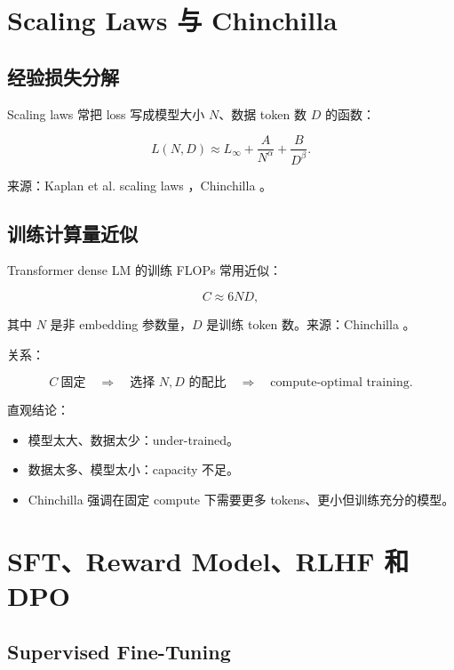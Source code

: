 \documentclass[UTF8,12pt]{ctexart}
\newcommand{\1}{\mathbf{1}}
\begin{document}
\section{Scaling Laws 与 Chinchilla}

\subsection{经验损失分解}

Scaling laws 常把 loss 写成模型大小 $N$、数据 token 数 $D$ 的函数：

\begin{equation}
L(N,D)
\approx L_\infty+\frac{A}{N^\alpha}+\frac{B}{D^\beta}.
\label{eq:scaling-laws}
\end{equation}

来源：Kaplan et al. scaling laws \cite{kaplan2020scaling}，Chinchilla \cite{hoffmann2022chinchilla}。

\subsection{训练计算量近似}

Transformer dense LM 的训练 FLOPs 常用近似：

\begin{equation}
C\approx 6ND,
\label{eq:training-compute}
\end{equation}

其中 $N$ 是非 embedding 参数量，$D$ 是训练 token 数。来源：Chinchilla \cite{hoffmann2022chinchilla}。

关系：

\[
C\ \text{固定}
\quad\Longrightarrow\quad
\text{选择 }N,D\text{ 的配比}
\quad\Longrightarrow\quad
\text{compute-optimal training}.
\]

直观结论：

\begin{itemize}
  \item 模型太大、数据太少：under-trained。
  \item 数据太多、模型太小：capacity 不足。
  \item Chinchilla 强调在固定 compute 下需要更多 tokens、更小但训练充分的模型。
\end{itemize}

\section{SFT、Reward Model、RLHF 和 DPO}

\subsection{Supervised Fine-Tuning}
\end{document}
